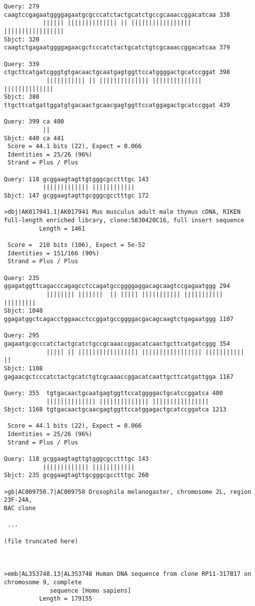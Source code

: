 \begin{lstlisting}
Query: 279 caagtccgagaatggggagaatgcgcccatctactgcatctgccgcaaaccggacatcaa 338
           |||||| |||||||||||||| || ||||||||||||||||| |||||||||||||||||
Sbjct: 320 caagtctgagaatggggagaacgctcccatctactgcatctgtcgcaaaccggacatcaa 379

Query: 339 ctgcttcatgatcgggtgtgacaactgcaatgagtggttccatggggactgcatccggat 398
            ||||||||||| || |||||||||||||| |||||||||||||| ||||||||||||||
Sbjct: 380 ttgcttcatgattggatgtgacaactgcaacgagtggttccatggagactgcatccggat 439

Query: 399 ca 400
           ||
Sbjct: 440 ca 441
 Score = 44.1 bits (22), Expect = 0.066
 Identities = 25/26 (96%)
 Strand = Plus / Plus

Query: 118 gcggaagtagttgtgggcgcctttgc 143
           ||||||||||||| ||||||||||||
Sbjct: 147 gcggaagtagttgcgggcgcctttgc 172

>dbj|AK017941.1|AK017941 Mus musculus adult male thymus cDNA, RIKEN
full-length enriched library, clone:5830420C16, full insert sequence
          Length = 1461

 Score =  210 bits (106), Expect = 5e-52
 Identities = 151/166 (90%)
 Strand = Plus / Plus

Query: 235  ggagatggttcagacccagagcctccagatgccggggaggacagcaagtccgagaatggg 294
            |||||||| |||||||  || ||||| ||||||||||| ||||||||||| |||||||||
Sbjct: 1048 ggagatggctcagacctggaacctccggatgccggggacgacagcaagtctgagaatggg 1107

Query: 295  gagaatgcgcccatctactgcatctgccgcaaaccggacatcaactgcttcatgatcggg 354
            ||||| || ||||||||||||||||| ||||||||||||||||| ||||||||||| ||
Sbjct: 1108 gagaacgctcccatctactgcatctgtcgcaaaccggacatcaattgcttcatgattgga 1167

Query: 355  tgtgacaactgcaatgagtggttccatggggactgcatccggatca 400
            |||||||||||||| |||||||||||||| ||||||||||||||||
Sbjct: 1168 tgtgacaactgcaacgagtggttccatggagactgcatccggatca 1213

 Score = 44.1 bits (22), Expect = 0.066
 Identities = 25/26 (96%)
 Strand = Plus / Plus

Query: 118 gcggaagtagttgtgggcgcctttgc 143
           ||||||||||||| ||||||||||||
Sbjct: 235 gcggaagtagttgcgggcgcctttgc 260

>gb|AC009750.7|AC009750 Drosophila melanogaster, chromosome 2L, region 23F-24A,
BAC clone

 ... 

(file truncated here)



>emb|AL353748.13|AL353748 Human DNA sequence from clone RP11-317B17 on
chromosome 9, complete
             sequence [Homo sapiens]
          Length = 179155


\end{lstlisting}
